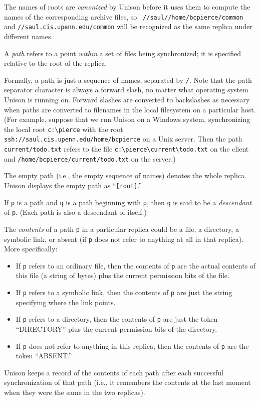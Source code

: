\documentclass{article}
\begin{document}
The names of roots are {\em canonized} by Unison before it uses them
to compute the names of the corresponding archive files, so {\tt
  //saul//home/bcpierce/common} and {\tt //saul.cis.upenn.edu/common}
will be recognized as the same replica under different names.


A {\em path} refers to a point {\em within} a set of files being
synchronized; it is specified relative to the root of the replica.

Formally, a path is just a sequence of names, separated by \verb|/|.
Note that the path separator character is always a forward slash, no
matter what operating system Unison is running on.  Forward slashes
are converted to backslashes as necessary when paths are converted to
filenames in the local filesystem on a particular host.
%
(For example, suppose that we run Unison on a Windows system, synchronizing
the local root \verb|c:\pierce| with the root
\verb|ssh://saul.cis.upenn.edu/home/bcpierce| on a Unix server.  Then
the path \verb|current/todo.txt| refers to the file
\verb|c:\pierce\current\todo.txt| on the client and
\verb|/home/bcpierce/current/todo.txt| on the server.)

The empty path (i.e., the empty sequence of names) denotes the whole
replica.  Unison displays the empty path as ``\verb|[root]|.''

If \verb|p| is a path and \verb|q| is a path beginning with \verb|p|, then
\verb|q| is said to be a {\em descendant} of \verb|p|.  (Each path is also a
descendant of itself.)



The {\em contents} of a path \verb|p| in a particular replica could be a
file, a directory, a symbolic link, or absent (if \verb|p| does not
refer to anything at all in that replica).  More specifically:
\begin{itemize}
\item If \verb|p| refers to an ordinary file, then the
contents of \verb|p| are the actual contents of this file (a string of bytes)
plus the current permission bits of the file.
\item If \verb|p| refers to a symbolic link, then the contents of \verb|p|
are just the string specifying where the link points.
\item If \verb|p| refers to a directory, then the
contents of \verb|p| are just the token ``DIRECTORY'' plus the current
permission bits of the directory.
\item If \verb|p| does not refer to anything in this replica, then the
contents of \verb|p| are the token ``ABSENT.''
\end{itemize}
Unison keeps a record of the contents of each path after each
successful synchronization of that path (i.e., it remembers the
contents at the last moment when they were the same in the two
replicas).
\end{document}
